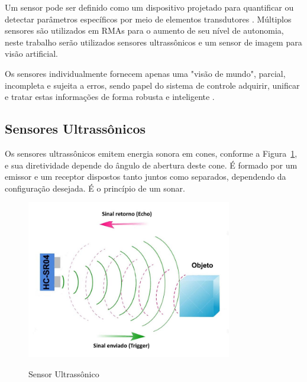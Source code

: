 Um sensor pode ser definido como um dispositivo projetado para quantificar ou detectar parâmetros específicos por meio de elementos transdutores \cite{rogeralex1999}. 
Múltiplos sensores são utilizados em RMAs para o aumento de seu nível de autonomia, neste trabalho serão utilizados sensores ultrassônicos e um sensor de imagem para visão artificial.

Os sensores individualmente fornecem apenas uma "visão de mundo", parcial, incompleta e sujeita a erros, sendo papel do sistema de controle adquirir, unificar e tratar estas informações de forma robusta e inteligente \cite{wolf2009robotica}.

\subsection{Sensores Ultrassônicos}
\label{subsec:sensores-ultrassônicos}

Os sensores ultrassônicos emitem energia sonora em cones, conforme a Figura~\ref{fig:sensor-ultrassonico}, e sua diretividade depende do ângulo de abertura deste cone. É formado por um emissor e um receptor dispostos tanto juntos como separados, dependendo da configuração desejada. É o princípio de um sonar.

\begin{figure}[!hbtp]
  \centering
   \caption{Sensor Ultrassônico}
    \includegraphics[width = 0.8\textwidth]{Caps/Figs/mat-met/ultrassonico.jpg}
   \label{fig:sensor-ultrassonico}
\end{figure}

